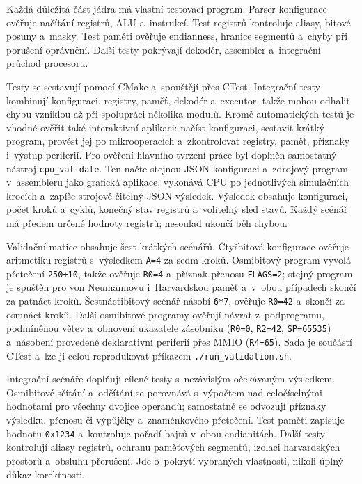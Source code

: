 \documentclass[hidelinks, 12pt]{article}%
\begin{document}
Každá důležitá část jádra má vlastní testovací program. Parser konfigurace ověřuje načítání registrů, ALU a~instrukcí. Test registrů kontroluje aliasy, bitové posuny a~masky. Test paměti ověřuje endianness, hranice segmentů a~chyby při porušení oprávnění. Další testy pokrývají dekodér, assembler a~integrační průchod procesoru.

Testy se sestavují pomocí CMake a~spouštějí přes CTest. Integrační testy kombinují konfiguraci, registry, paměť, dekodér a~executor, takže mohou odhalit chybu vzniklou až při spolupráci několika modulů. Kromě automatických testů je vhodné ověřit také interaktivní aplikaci: načíst konfiguraci, sestavit krátký program, provést jej po mikrooperacích a~zkontrolovat registry, paměť, příznaky i~výstup periferií.
Pro ověření hlavního tvrzení práce byl doplněn samostatný nástroj \texttt{cpu\_validate}. Ten načte stejnou JSON konfiguraci a~zdrojový program v~assembleru jako grafická aplikace, vykonává CPU po jednotlivých simulačních krocích a~zapíše strojově čitelný JSON výsledek. Výsledek obsahuje konfiguraci, počet kroků a~cyklů, konečný stav registrů a~volitelný sled stavů. Každý scénář má předem určené hodnoty registrů; nesoulad ukončí běh chybou.

Validační matice obsahuje šest krátkých scénářů. Čtyřbitová konfigurace ověřuje aritmetiku registrů s~výsledkem \texttt{A=4} za sedm kroků. Osmibitový program vyvolá přetečení \texttt{250+10}, takže ověřuje \texttt{R0=4} a~příznak přenosu \texttt{FLAGS=2}; stejný program je spuštěn pro von Neumannovu i~Harvardskou paměť a~v~obou případech skončí za patnáct kroků. Šestnáctibitový scénář násobí \texttt{6*7}, ověřuje \texttt{R0=42} a~skončí za osmnáct kroků. Další osmibitové programy ověřují návrat z~podprogramu, podmíněnou větev a~obnovení ukazatele zásobníku (\texttt{R0=0}, \texttt{R2=42}, \texttt{SP=65535}) a~násobení provedené deklarativní periferií přes MMIO (\texttt{R4=65}). Sada je součástí CTest a~lze ji celou reprodukovat příkazem \texttt{./run\_validation.sh}.

Integrační scénáře doplňují cílené testy s~nezávislým očekávaným výsledkem. Osmibitové sčítání a~odčítání se porovnává s~výpočtem nad celočíselnými hodnotami pro všechny dvojice operandů; samostatně se odvozují příznaky výsledku, přenosu či výpůjčky a~znaménkového přetečení. Test paměti zapisuje hodnotu \texttt{0x1234} a~kontroluje pořadí bajtů v~obou endianitách. Další testy kontrolují aliasy registrů, ochranu paměťových segmentů, izolaci harvardských prostorů a~obsluhu přerušení. Jde o~pokrytí vybraných vlastností, nikoli úplný důkaz korektnosti.
\end{document}
